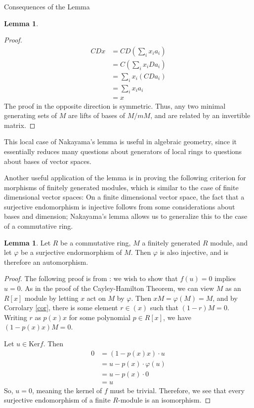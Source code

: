 \documentclass[12pt]{article}
\theoremstyle{definition}
\newtheorem{lemma}[definition]{Lemma}
\begin{document}
\begin{section}{Consequences of the Lemma}
\begin{lemma}
\begin{proof}
		\begin{align*} CDx &= CD \left( \sum_{i}x_i a_i \right) \\
			&= C\left( \sum_{i}x_i Da_i \right)\\
			&= \sum_{i}x_i (CDa_i)\\
			&= \sum_{i} x_i a_i\\
			&= x
		\end{align*}
		The proof in the opposite direction is symmetric. Thus, any two minimal generating sets of $M$ are lifts of bases of $M/mM$, and are related by an invertible matrix.
		\end{proof}
		\label{local}
	\end{lemma}
	This local case of Nakayama's lemma is useful in algebraic geometry, since it essentially reduces many questions about generators of local rings to questions about bases of vector spaces. 
	\par Another useful application of the lemma is in proving the following criterion for morphisms of finitely generated modules, which is similar to the case of finite dimensional vector spaces: On a finite dimensional vector space, the fact that a surjective endomorphism is injective follows from some considerations about bases and dimension; Nakayama's lemma allows us to generalize this to the case of a commutative ring.\begin{lemma}
		Let $R$ be a commutative ring, $M$ a finitely generated $R$ module, and let $\varphi$ be a surjective endormorphism of $M$. Then $\varphi$ is also injective, and is therefore an automorphism.	
		\label{aut}
		\begin{proof}
			The following proof is from \cite{matsumura}: we wish to show that $f(u) = 0 $ implies $ u = 0$. As in the proof of the Cayley-Hamilton Theorem, we can view $M$ as an $R[x]$ module by letting $x$ act on $M$ by $\varphi$. Then $xM = \varphi(M) = M$, and by Corrolary \ref{cor}, there is some element $r \in (x)$ such that $(1-r)M = 0$. Writing $r$ as $p(x)x$ for some polynomial $p \in R[x]$, we have $(1 - p(x)x)M = 0$. 
			\par Let $u \in \text{Ker} f$. Then 
			\begin{align*}
				0 &= (1 - p(x)x) \cdot u\\
				&= u - p(x)\cdot \varphi(u)\\
				&= u - p(x) \cdot 0\\
				&= u
			\end{align*}
			So, $u = 0$, meaning the kernel of $f$ must be trivial. Therefore, we see that every surjective endomorphism of a finite $R$-module is an isomorphism.

\end{proof}
\end{lemma}
\end{section}
\end{document}
